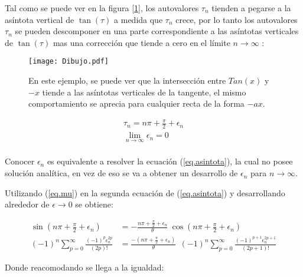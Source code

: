 Tal como se puede ver en la figura [\ref{fig:Dibujo1}], los autovalores $\tau _n$ tienden a pegarse a la asíntota vertical de $ \tan ( \tau ) $ a medida que $\tau _n$ crece, por lo tanto los autovalores $\tau _n$ se pueden descomponer en una parte correspondiente a las asíntotas verticales de $ \tan ( \tau )$ mas una corrección que tiende a cero en el límite $ n  \rightarrow \infty$ :

\begin{figure}
    \centering
    \texttt{[image: Dibujo.pdf]}
    \caption{En este ejemplo, se puede ver que la intersección entre $Tan(x)$ y $-x$ tiende a las asíntotas verticales de la tangente, el mismo comportamiento se aprecia para cualquier recta de la forma $- a x$.}
    \label{fig:Dibujo1}
\end{figure}

\begin{equation}
\begin{array}{c}
    \tau _n = n \pi + \frac{\pi}{2} + \epsilon _n \\[5pt]
    \lim \limits_{ n \rightarrow \infty} \epsilon _n = 0 \\
    
\end{array}
\label{eq.mu}
\end{equation}


Conocer $\epsilon _n $ es equivalente a resolver la ecuación (\ref{eq.asintota}), la cual no posee solución analítica, en vez de eso se va a obtener un desarrollo de $\epsilon _n $ para $n \rightarrow \infty$.

Utilizando (\ref{eq.mu}) en la segunda ecuación de (\ref{eq.asintota}) y desarrollando alrededor de $\epsilon \rightarrow{0}$ se obtiene:

\begin{equation}
\begin{aligned}
    \sin( n \pi + \frac{\pi}{2} + \epsilon _n ) &= 
    - \frac{n \pi + \frac{\pi}{2} + \epsilon _n}{\theta}  \ \cos( n \pi + \frac{\pi}{2} + \epsilon _n )  \\
         (-1) ^n \sum _{p=0} ^{\infty} \frac{(-1) ^p  \epsilon _n ^{2 p }}{(2p)!} 
    &=  \frac{-(n \pi + \frac{\pi}{2} + \epsilon _n) }{\theta}  \  \	
    (-1) ^n
     \sum _{p=0} ^{\infty} \frac{(-1) ^ {p+1} \epsilon _n ^{2 p + 1}}{(2p+1)!} 
\end{aligned}
\end{equation}


Donde reacomodando se llega a la igualdad:

